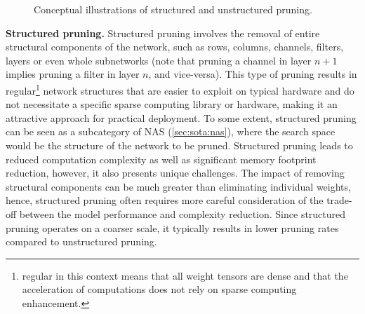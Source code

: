 \begin{figure}
  \centering
  \hspace{0.09\textwidth}
  \caption{Conceptual illustrations of structured and unstructured pruning.}
  \label{fig:sota:pruning}
\end{figure}

\noindent\textbf{Structured pruning.} Structured pruning involves the removal of
entire structural components of the network, such as rows, columns, channels,
filters, layers or even whole subnetworks (note that pruning a channel in layer
$n+1$ implies pruning a filter in layer $n$, and vice-versa). This type of
pruning results in regular\footnote{regular in this context means that all
  weight tensors are dense and that the acceleration of computations does not rely
  on sparse computing enhancement.} network structures that are easier to exploit
on typical hardware and do not necessitate a specific sparse computing library
or hardware, making it an attractive approach for practical deployment. To some
extent, structured pruning can be seen as a subcategory of \acl{NAS}
(\cref{sec:sota:nas}), where the search space would be the structure of the
network to be pruned. Structured pruning leads to reduced computation complexity
as well as significant memory footprint reduction, however, it also presents
unique challenges. The impact of removing structural components can be much
greater than eliminating individual weights, hence, structured pruning often
requires more careful consideration of the trade-off between the model
performance and complexity reduction. Since structured pruning operates on a
coarser scale, it typically results in lower pruning rates compared to
unstructured pruning.\\


